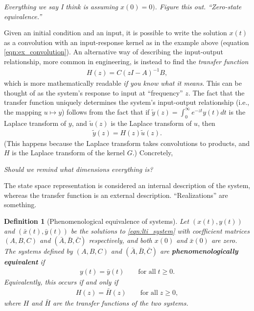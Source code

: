 \documentclass[11 pt]{article}
\newcommand{\plr}[1]{{\color{blue}\it #1}}
\newtheorem{definition}{Definition}
\begin{document}
\plr{Everything we say I think is assuming $x(0)=0)$.  
Figure this out. ``Zero-state equivalence.''}

Given an initial condition and an input, 
it is possible to write the solution $x(t)$
as a convolution with an input-response kernel as in the example above
(equation \eqref{eqn:ex_convolution}).
An alternative way of describing the input-output relationship,
more common in engineering,
is instead to find the \emph{transfer function}
\begin{align} \label{eqn:transfer_fn}
    H(z) = C(z I - A)^{-1} B,
\end{align}
which is more mathematically readable \plr{if you know what it means}.
This can be thought of as the system's response to input at ``frequency'' $z$.
The fact that the transfer function uniquely determines the system's
input-output relationship (i.e., the mapping $u \mapsto y$)
follows from the fact that if $\tilde y(z) = \int_0^\infty e^{-zt} y(t) dt$
is the Laplace transform of $y$,
and $\tilde u(z)$ is the Laplace transform of $u$,
then
\begin{align*}
    \tilde y(z) = H(z) \tilde u(z) .
\end{align*}
(This happens because the Laplace transform takes convolutions to products,
and $H$ is the Laplace transform of the kernel $G$.)
Concretely,

\plr{Should we remind what dimensions everything is?}

The state space representation is considered an internal description of the
system, whereas the transfer function is an external description. 
``Realizations'' are something.

\begin{definition}[Phenomenological equivalence of systems]
    Let $(x(t),y(t))$ and $(\bar x(t),\bar y(t))$ be the solutions to \eqref{eqn:lti_system}
    with coefficient matrices $(A,B,C)$ and $(\bar A,\bar B,\bar C)$ respectively,
    and both $x(0)$ and $\bar x(0)$ are zero. 
    The systems defined by $(A,B,C)$ and $(\bar A,\bar B,\bar C)$ are
    \textbf{phenomenologically equivalent} 
    if
    \begin{align*}
        y(t) = \bar y(t) \qquad \text{for all} \; t \ge 0.
    \end{align*}
    Equivalently, this occurs if and only if
    \begin{align*}
        H(z) = \bar H(z)  \qquad \text{for all} \; z \ge 0,
    \end{align*}
    where $H$ and $\bar H$ are the transfer functions of the two systems.
\end{definition}
\end{document}
